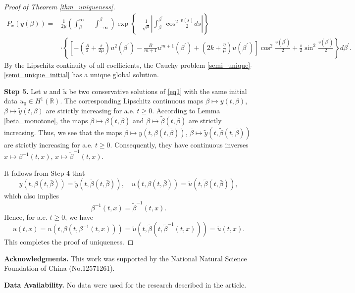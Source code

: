 \documentclass[10pt]{article}
\numberwithin{equation}{section}
\begin{document}
\begin{proof}[Proof of Theorem \ref{thm_uniqueness}]
\begin{align*}
			P_x(y(\beta)) =&\frac{1}{2\mu}\left(\int_\beta^\infty-\int_{-\infty}^\beta\right)\exp\left\{-\frac{1}{\sqrt{\mu}}\left|\int_{\beta}^{\beta^{\prime}}\cos^{2}\frac{v(s)}{2}ds\right|\right\} \\
			& \cdot\left\{\left[-(\frac{A}{2}+\frac{s}{2\mu})u^2(\beta^{\prime})-\frac{B}{m+1}u^{m+1}(\beta^{\prime})+(2k+\frac{\eta}{\mu})u(\beta^{\prime})\right]\cos^2\frac{v(\beta^{\prime})}{2}+\frac{s}{2}\sin^2\frac{v(\beta^{\prime})}{2}\right\}d\beta^{\prime}.
		\end{align*}
		By the Lipschitz continuity of all coefficients, the Cauchy problem \eqref{semi_unique}-\eqref{semi_unique_initial} has a unique global solution.
		
		\textbf{Step 5.} Let $u$ and $\tilde{u}$ be two conservative solutions of \eqref{eq1} with the same initial data $u_0\in H^1(\mathbb{R})$. The corresponding Lipschitz continuous maps $\beta\mapsto y(t,\beta)$, $\beta\mapsto\tilde{y}(t,\beta)$ are strictly increasing for a.e. $t\geq0$. According to Lemma \ref{beta_monotone}, the maps $\bar{\beta}\mapsto\beta(t,\bar{\beta})$ and $\bar{\beta}\mapsto\tilde{\beta}(t,\bar{\beta})$ are strictly increasing. Thus, we see that the maps $\bar{\beta}\mapsto y(t,\beta(t,\bar{\beta}))$, $\bar{\beta}\mapsto\tilde{y}(t,\tilde{\beta}(t,\bar{\beta}))$ are strictly increasing for a.e. $t\geq0$. Consequently, they have continuous inverses $x\mapsto\beta^{-1}(t,x)$, $x\mapsto\tilde{\beta}^{-1}(t,x)$.
		
		It follows from Step 4 that 
		$$y(t,\beta(t,\bar{\beta}))=\tilde{y}(t,\tilde{\beta}(t,\bar{\beta})),\quad u(t,\beta(t,\bar{\beta}))=\tilde{u}(t,\tilde{\beta}(t,\bar{\beta})),$$
		which also implies
		$$\beta^{-1}(t,x)=\tilde{\beta}^{-1}(t,x).$$
		Hence, for a.e. $t\geq0$, we have
		$$u(t,x)=u(t,\beta(t,\beta^{-1}(t,x)))=\tilde{u}(t,\tilde{\beta}(t,\tilde{\beta}^{-1}(t,x)))=\tilde{u}(t,x).$$
		This completes the proof of uniqueness.
	\end{proof}
	
	
	
	\smallskip
	\noindent\textbf{Acknowledgments.} This work was supported by the National Natural Science Foundation of China (No.12571261).
	
	
	\noindent\textbf{Data Availability.}
	No data were used for the research described in the article.
	
	
	
\end{document}
